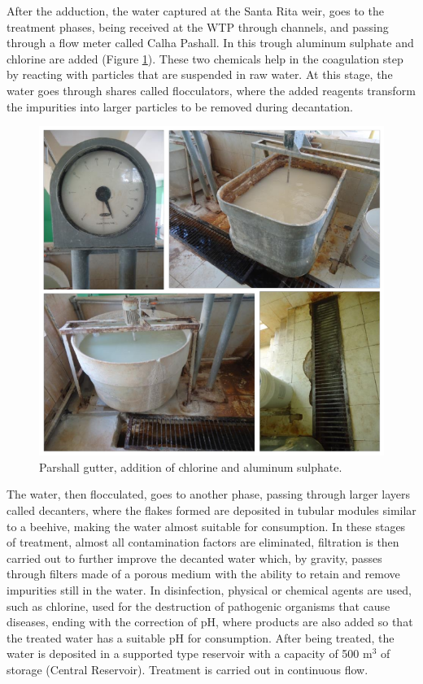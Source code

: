 \documentclass{singlecol}
\theoremstyle{TH}{
\newtheorem{lemma}{Lemma}
\newtheorem{theorem}[lemma]{Theorem}
\newtheorem{corrolary}[lemma]{Corrolary}
\newtheorem{conjecture}[lemma]{Conjecture}
\newtheorem{proposition}[lemma]{Proposition}
\newtheorem{claim}[lemma]{Claim}
\newtheorem{stheorem}[lemma]{Wrong Theorem}
\newtheorem{algorithm}{Algorithm}
}
\theoremstyle{THrm}{
\newtheorem{definition}{Definition}[section]
\newtheorem{question}{Question}[section]
\newtheorem{remark}{Remark}
\newtheorem{scheme}{Scheme}
}
\theoremstyle{THhit}{
\newtheorem{case}{Case}[section]
}
\begin{document}
After the adduction, the water captured at the Santa Rita weir, goes to the treatment phases, being received at the WTP through channels, and passing through a flow meter called Calha Pashall. In this trough aluminum sulphate and chlorine are added (Figure \ref{fig:WTPParshall}). These two chemicals help in the coagulation step by reacting with particles that are suspended in raw water. At this stage, the water goes through shares called flocculators, where the added reagents transform the impurities into larger particles to be removed during decantation. 

\begin{figure}[h]
\caption{Parshall gutter, addition of chlorine and aluminum sulphate.}
\label{fig:WTPParshall}
\centering
\includegraphics[width=\textwidth]{figures/calhaPashall.png}
\end{figure}

The water, then flocculated, goes to another phase, passing through larger layers called decanters, where the flakes formed are deposited in tubular modules similar to a beehive, making the water almost suitable for consumption. In these stages of treatment, almost all contamination factors are eliminated, filtration is then carried out to further improve the decanted water which, by gravity, passes through filters made of a porous medium with the ability to retain and \label{firstChange}{remove impurities still in the water}. In disinfection, physical or chemical agents are used, such as chlorine, used for the destruction of pathogenic organisms that cause diseases, ending with the correction of pH, where products are also added so that the treated water has a suitable pH for consumption. After being treated, the water is deposited in a supported type reservoir with a capacity of 500 m$^3$ of storage (Central Reservoir). Treatment is carried out in continuous flow. 
\end{document}
